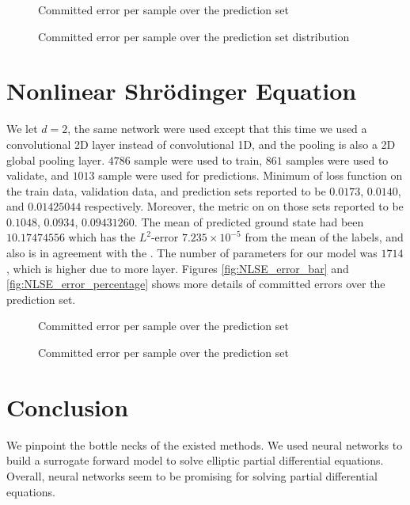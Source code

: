\begin{figure}[h!]
	{
		\centering
		\def\svgwidth{\columnwidth}
		\scalebox{.5}{}
		\caption{Committed error per sample over the prediction set}
		\label{fig:ECIM_error_bar}
	}
\end{figure}

\begin{figure}[h!]
	{
		\centering
		\def\svgwidth{\columnwidth}
		\scalebox{.5}{}
		\caption{Committed error per sample over the prediction set distribution}
		\label{fig:ECIM_error_percentage}
	}
\end{figure}
\section{Nonlinear Shr\"{o}dinger Equation}
We let $d=2$, the same network were used except that this time we used a convolutional 2D layer instead of convolutional 1D, and the pooling is also a 2D global pooling layer. $4786$ sample were used to train, $861$ samples were used to validate, and $1013$ sample were used for predictions. Minimum of loss function on the train data, validation data, and prediction sets reported to be $0.0173$, $0.0140$, and $0.01425044$ respectively. Moreover, the metric on on those sets reported to be  $0.1048$, $0.0934$, $0.09431260$. The mean of predicted ground state had been $10.17474556$ which has the $L^2$-error $7.235 \times 10^{-5}$ from the mean of the labels, and also is in agreement with the \cite{Base_paper}. The number of parameters for our model was $1714$, which is higher due to more layer. Figures \eqref{fig:NLSE_error_bar} and \eqref{fig:NLSE_error_percentage} shows more details of committed errors over the prediction set. 
\begin{figure}[h!]
	{
		\centering
		\def\svgwidth{\columnwidth}
		\scalebox{.5}{}
		\caption{Committed error per sample over the prediction set}
		\label{fig:NLSE_error_bar}
	}
\end{figure}

\begin{figure}[h!]
	{
		\centering
		\def\svgwidth{\columnwidth}
		\scalebox{.5}{}
		\caption{Committed error per sample over the prediction set}
		\label{fig:NLSE_error_percentage}
	}
\end{figure}

\section{Conclusion}
We pinpoint the bottle necks of the existed methods. We used neural networks to build a surrogate forward model to solve elliptic partial differential equations.
Overall, neural networks seem to be promising for solving partial differential equations.


